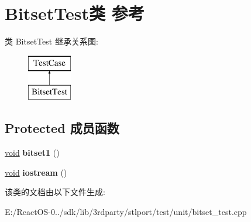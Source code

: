 \hypertarget{class_bitset_test}{}\section{Bitset\+Test类 参考}
\label{class_bitset_test}
类 Bitset\+Test 继承关系图\+:\begin{figure}[H]
\begin{center}
\leavevmode
\includegraphics[height=2.000000cm]{class_bitset_test}
\end{center}
\end{figure}
\subsection*{Protected 成员函数}
\begin{DoxyCompactItemize}
\item 
\mbox{\label{class_bitset_test_a9e7d535fed5964ca7883504f1c1e955b}} 
\hyperlink{interfacevoid}{void} {\bfseries bitset1} ()
\item 
\mbox{\label{class_bitset_test_af28f77d193147ab50be3ebffddc3aa4b}} 
\hyperlink{interfacevoid}{void} {\bfseries iostream} ()
\end{DoxyCompactItemize}


该类的文档由以下文件生成\+:\begin{DoxyCompactItemize}
\item 
E\+:/\+React\+O\+S-\/0../sdk/lib/3rdparty/stlport/test/unit/bitset\+\_\+test.\+cpp\end{DoxyCompactItemize}

